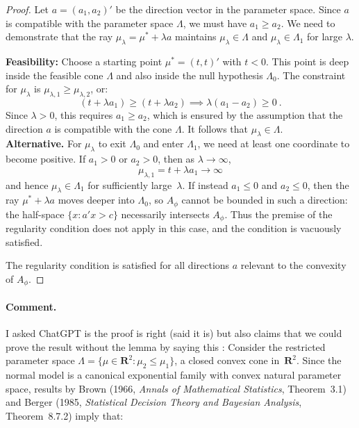 \documentclass[12pt]{article}
\theoremstyle{definition}
\theoremstyle{remark}
\begin{document}
\begin{proof}
Let $a = (a_1, a_2)'$ be the direction vector in the parameter space. Since $a$ is compatible with the parameter space $\Lambda$, we must have $a_1 \ge a_2$. We need to demonstrate that the ray $\mu_{\lambda}= \mu^* + \lambda a$ maintains $\mu_{\lambda} \in \Lambda$ and $\mu_{\lambda} \in \Lambda_1$ for large $\lambda$.

\medskip

\noindent \textbf{Feasibility:} Choose a starting point $\mu^*=(t,t)'$ with $t<0$. This point is deep inside the feasible cone $\Lambda$ and also inside the null hypothesis $\Lambda_0$.
The constraint for $\mu_{\lambda}$ is $\mu_{\lambda,1} \ge \mu_{\lambda,2}$, or:
\[
(t + \lambda a_1) \ge (t + \lambda a_2) \implies \lambda (a_1 - a_2) \ge 0~.
\]
Since $\lambda > 0$, this requires $a_1 \ge a_2$, which is ensured by the assumption that the direction $a$ is compatible with the cone $\Lambda$. It follows that $\mu_{\lambda}\in \Lambda$.\\

\noindent \textbf{Alternative.}
For $\mu_\lambda$ to exit $\Lambda_0$ and enter $\Lambda_1$, we need at least one coordinate to become positive.
If $a_1 > 0$ or $a_2 > 0$, then as $\lambda \to \infty$,
\[
\mu_{\lambda,1} = t + \lambda a_1 \to \infty
\]
and hence $\mu_\lambda \in \Lambda_1$ for sufficiently large~$\lambda$.
If instead $a_1 \le 0$ and $a_2 \le 0$, then the ray $\mu^*+\lambda a$ moves deeper into $\Lambda_0$,
so $A_\phi$ cannot be bounded in such a direction: the half-space
$\{x:a'x>c\}$ necessarily intersects $A_\phi$.
Thus the premise of the regularity condition does not apply in this case,
and the condition is vacuously satisfied.

The regularity condition is satisfied for all directions $a$ relevant to the convexity of $A_\phi$.
\end{proof}

\paragraph{Comment.} I asked ChatGPT is the proof is right (said it is) but also claims that we could prove the result without the lemma by saying this : Consider the restricted parameter space 
$\Lambda = \{\mu \in \mathbf{R}^2 : \mu_2 \le \mu_1\}$,
a closed convex cone in~$\mathbf{R}^2$. Since the normal model is a canonical exponential family with convex natural parameter space, results by Brown (1966, \emph{Annals of Mathematical Statistics}, Theorem~3.1) and Berger (1985, \emph{Statistical Decision Theory and Bayesian Analysis}, Theorem~8.7.2) imply that:
\end{document}
